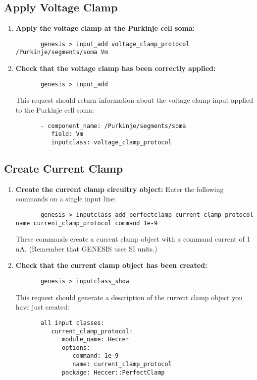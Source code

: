 \documentclass[12pt]{article}
\begin{document}
\subsection*{Apply Voltage Clamp}

\begin{enumerate}
	\item{\bf Apply the voltage clamp at the Purkinje cell soma:}
	\begin{verbatim}
	   genesis > input_add voltage_clamp_protocol /Purkinje/segments/soma Vm
	\end{verbatim}
	
	\item{\bf Check that the voltage clamp has been correctly applied:}
	\begin{verbatim}
	   genesis > input_add
	\end{verbatim}
	This request should return information about the voltage clamp input applied to the Purkinje cell soma:
	\begin{verbatim}
	   - component_name: /Purkinje/segments/soma
	      field: Vm
	      inputclass: voltage_clamp_protocol
	   \end{verbatim}
\end{enumerate}

\subsection*{Create Current Clamp}

\begin{enumerate}
	\item{\bf Create the current clamp circuitry object:} Enter the following commands on a single input line:
	\begin{verbatim}
	   genesis > inputclass_add perfectclamp current_clamp_protocol name current_clamp_protocol command 1e-9
	\end{verbatim}
	These commands create a current clamp object with a command current of 1\,nA. (Remember that GENESIS uses SI units.)
	
	\item{\bf Check that the current clamp object has been created:}
	\begin{verbatim}
	   genesis > inputclass_show
	\end{verbatim}
	This request should generate a description of the current clamp object you have just created:
	\begin{verbatim}
	   all input classes: 
	      current_clamp_protocol:
	         module_name: Heccer
	         options:
	            command: 1e-9
	            name: current_clamp_protocol
	         package: Heccer::PerfectClamp
	\end{verbatim}
\end{enumerate}
\end{document}
